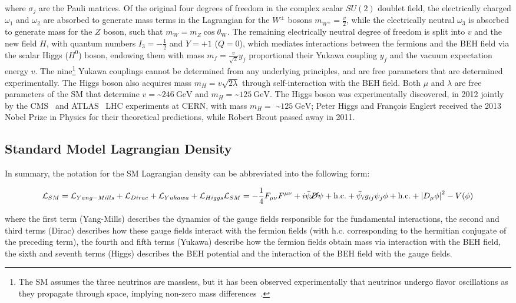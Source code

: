 where $\sigma_j$ are the Pauli matrices.
Of the original four degrees of freedom in the complex scalar $SU(2)$ doublet field, the electrically charged $\omega_1$ and $\omega_2$ are absorbed to generate mass terms in the Lagrangian for the $W^\pm$ bosons $m_{W^\pm} = \frac{v}{2}$, while the electrically neutral $\omega_3$ is absorbed to generate mass for the $Z$ boson, such that $m_W = m_Z \cos \theta_{\mathrm{W}}$.
The remaining electrically neutral degree of freedom is split into $v$ and the new field $H$, with quantum numbers $I_3 = -\frac{1}{2}$ and $Y = +1$ ($Q = 0$), which mediates interactions between the fermions and the BEH field via the scalar Higgs ($H^0$) boson, endowing them with mass $m_f = \frac{v}{\sqrt{2}} y_f$ proportional their Yukawa coupling $y_f$ and the vacuum expectation energy $v$.
The nine\footnote{The SM assumes the three neutrinos are massless, but it has been observed experimentally that neutrinos undergo flavor oscillations as they propagate through space, implying non-zero mass differences~\cite{PhysRevLett.81.1562}.} Yukawa couplings cannot be determined from any underlying principles, and are free parameters that are determined experimentally.
The Higgs boson also acquires mass $m_H = v \sqrt{2 \lambda}$ through self-interaction with the BEH field.
Both $\mu$ and $\lambda$ are free parameters of the SM that determine $v =$\sim$ \SI{246}{\GeV}$ and $m_H =$\sim$\SI{125}{\GeV}$.
The Higgs boson was experimentally discovered, in 2012 jointly by the CMS~\cite{201230} and ATLAS~\cite{20121} LHC experiments at CERN, with mass $m_H =$ \sim$\SI{125}{\GeV}$; Peter Higgs and François Englert received the 2013 Nobel Prize in Physics for their theoretical predictions, while Robert Brout passed away in 2011.

\subsection{Standard Model Lagrangian Density}
In summary, the notation for the SM Lagrangian density can be abbreviated into the following form:
\begin{linenomath*}
\begin{align}
\mathcal{L}_{SM} = \mathcal{L}_{Yang-Mills} + \mathcal{L}_{Dirac} + \mathcal{L}_{Yukawa} + \mathcal{L}_{Higgs}
\mathcal{L}_{SM} = -\frac{1}{4} F_{\mu \nu} F^{\mu \nu} + i\bar{\psi} \cancel{D} \psi+\text {h.c.} + \bar{\psi}_i y_{i j} \psi_j \phi+\text {h.c.} + \left \vert D_\mu \phi\right \vert^2 - V(\phi)
\end{align}
\end{linenomath*}
where the first term (Yang-Mills) describes the dynamics of the gauge fields responsible for the fundamental interactions, the second and third terms (Dirac) describes how these gauge fields interact with the fermion fields (with h.c. corresponding to the hermitian conjugate of the preceding term), the fourth and fifth terms (Yukawa) describe how the fermion fields obtain mass via interaction with the BEH field, the sixth and seventh terms (Higgs) describes the BEH potential and the interaction of the BEH field with the gauge fields.

